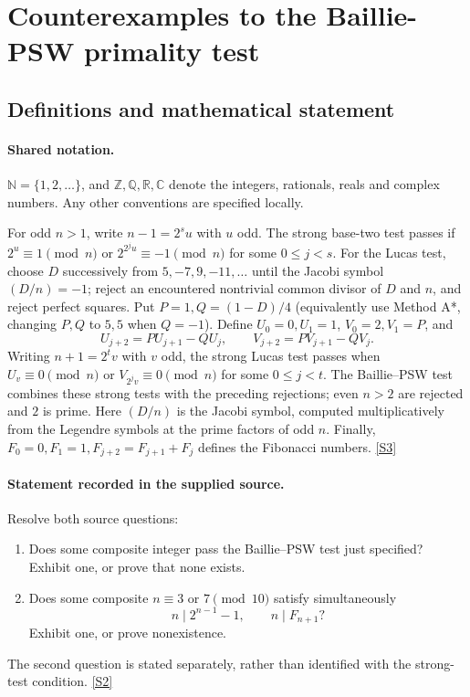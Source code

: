 \documentclass[11pt]{article}
\newcommand{\sref}[2]{\hyperlink{source:#1:#2}{[S#2]}}
\begin{document}
\section{Counterexamples to the Baillie-PSW primality test}\label{statement}

\subsection{Definitions and mathematical statement}

\paragraph{Shared notation.}$\mathbb N=\{1,2,\ldots\}$, and $\mathbb Z,\mathbb Q,\mathbb R,\mathbb C$ denote the integers, rationals, reals and complex numbers. Any other conventions are specified locally.


For odd $n>1$, write $n-1=2^su$ with $u$ odd. The strong base-two test passes if $2^u\equiv1\pmod n$ or $2^{2^ju}\equiv-1\pmod n$ for some $0\le j<s$. For the Lucas test, choose $D$ successively from $5,-7,9,-11,\ldots$ until the Jacobi symbol $(D/n)=-1$; reject an encountered nontrivial common divisor of $D$ and $n$, and reject perfect squares. Put $P=1,Q=(1-D)/4$ (equivalently use Method A*, changing $P,Q$ to $5,5$ when $Q=-1$). Define $U_0=0,U_1=1$, $V_0=2,V_1=P$, and
\[
 U_{j+2}=PU_{j+1}-QU_j,\qquad V_{j+2}=PV_{j+1}-QV_j.
\]
Writing $n+1=2^tv$ with $v$ odd, the strong Lucas test passes when $U_v\equiv0\pmod n$ or $V_{2^jv}\equiv0\pmod n$ for some $0\le j<t$. The Baillie--PSW test combines these strong tests with the preceding rejections; even $n>2$ are rejected and $2$ is prime. Here $(D/n)$ is the Jacobi symbol, computed multiplicatively from the Legendre symbols at the prime factors of odd $n$. Finally, $F_0=0,F_1=1,F_{j+2}=F_{j+1}+F_j$ defines the Fibonacci numbers. \sref{statement}{3}
\paragraph{Statement recorded in the supplied source.}
Resolve both source questions:
\begin{enumerate}
\item Does some composite integer pass the Baillie--PSW test just specified? Exhibit one, or prove that none exists.
\item Does some composite $n\equiv3$ or $7\pmod{10}$ satisfy simultaneously
\[
 n\mid 2^{n-1}-1,\qquad n\mid F_{n+1}?
\]
Exhibit one, or prove nonexistence.
\end{enumerate}
The second question is stated separately, rather than identified with the strong-test condition. \sref{statement}{2}
\end{document}
